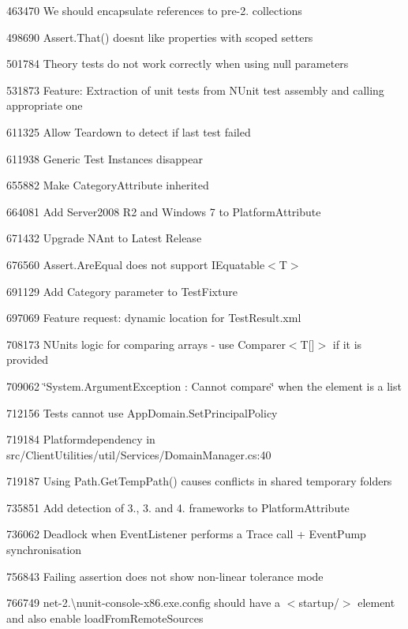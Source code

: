 \begin{DoxyItemize}
\item 463470 We should encapsulate references to pre-\/2. collections
\item 498690 Assert.\+That() doesn\textquotesingle{}t like properties with scoped setters
\item 501784 Theory tests do not work correctly when using null parameters
\item 531873 Feature\+: Extraction of unit tests from N\+Unit test assembly and calling appropriate one
\item 611325 Allow Teardown to detect if last test failed
\item 611938 Generic Test Instances disappear
\item 655882 Make Category\+Attribute inherited
\item 664081 Add Server2008 R2 and Windows 7 to Platform\+Attribute
\item 671432 Upgrade N\+Ant to Latest Release
\item 676560 Assert.\+Are\+Equal does not support {\ttfamily I\+Equatable$<$T$>$}
\item 691129 Add Category parameter to Test\+Fixture
\item 697069 Feature request\+: dynamic location for Test\+Result.\+xml
\item 708173 N\+Unit\textquotesingle{}s logic for comparing arrays -\/ use {\ttfamily Comparer$<$T\mbox{[}\mbox{]}$>$} if it is provided
\item 709062 \char`\"{}\+System.\+Argument\+Exception \+: Cannot compare\char`\"{} when the element is a list
\item 712156 Tests cannot use App\+Domain.\+Set\+Principal\+Policy
\item 719184 Platformdependency in src/\+Client\+Utilities/util/\+Services/\+Domain\+Manager.\+cs\+:40
\item 719187 Using Path.\+Get\+Temp\+Path() causes conflicts in shared temporary folders
\item 735851 Add detection of 3., 3. and 4. frameworks to Platform\+Attribute
\item 736062 Deadlock when Event\+Listener performs a Trace call + Event\+Pump synchronisation
\item 756843 Failing assertion does not show non-\/linear tolerance mode
\item 766749 net-\/2.\textbackslash{}nunit-\/console-\/x86.\+exe.\+config should have a {\ttfamily $<$startup/$>$} element and also enable load\+From\+Remote\+Sources

\end{DoxyItemize}
